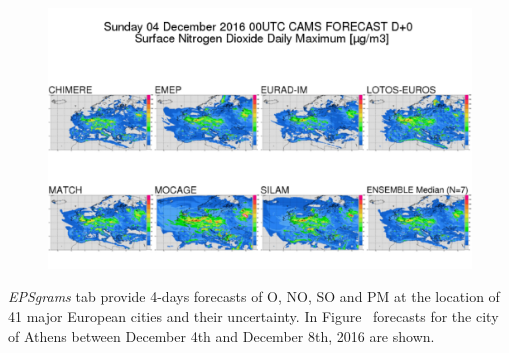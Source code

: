 \documentclass[9pt]{report}
\begin{document}
\begin{figure}[h!]%
\begin{mdcenter}%

\noindent{}\includegraphics[keepaspectratio=true,width=\dimmin{}{\dimwidth{0.90}}]{images/regional_maximum}{}%

\mdhr{}%

\noindent{}%
\end{mdcenter}\label{regional-maximum}%
\end{figure}%

\noindent{}\emph{EPSgrams} tab provide 4-days forecasts of O, NO, SO and PM at the location of 41 major European cities and their uncertainty.
In Figure~ forecasts for the city of Athens between December 4th and December 8th, 2016 are shown.%
\end{document}
